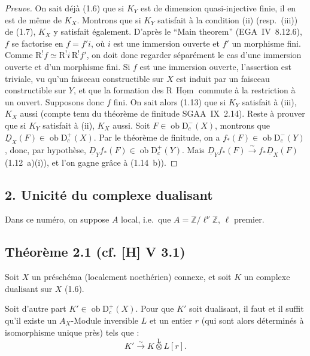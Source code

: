\documentclass[11pt]{article}
\DeclareMathOperator{\Hom}{Hom}
\newcommand{\R}{\mathrm{R}}
\newcommand{\D}{\mathrm{D}}
\newcommand{\Z}{\mathbb{Z}}
\newcommand{\ob}{\operatorname{ob}}
\providecommand{\Hom}{\operatorname{Hom}}
\providecommand{\ob}{\operatorname{ob}}
\begin{document}
\begin{proof}[Preuve]
On sait déjà (1.6) que si $K_Y$ est de dimension quasi-injective finie, il en est de même de $K_X$. Montrons que si $K_Y$ satisfait à la condition (ii) (resp.~(iii)) de (1.7), $K_X$ y satisfait également. D'après le ``Main theorem'' (EGA~IV~8.12.6), $f$ se factorise en $f = f'i$, où $i$ est une immersion ouverte et $f'$ un morphisme fini. Comme $\R^{!}f \simeq \R^{!}i \, \R^{!}f'$, on doit donc regarder séparément le cas d'une immersion ouverte et d'un morphisme fini. Si $f$ est une immersion ouverte, l'assertion est triviale, vu qu'un faisceau constructible sur $X$ est induit par un faisceau constructible sur $Y$, et que la formation des $\R\,\underline{\Hom}$ commute à la restriction à un ouvert. Supposons donc $f$ fini. On sait alors (1.13) que si $K_Y$ satisfait à (iii), $K_X$ aussi (compte tenu du théorème de finitude SGAA~IX~2.14). Reste à prouver que si $K_Y$ satisfait à (ii), $K_X$ aussi. Soit $F \in \ob \D_c^{-}(X)$, montrons que $\underline{D}_X(F) \in \ob \D_c^{+}(X)$. Par le théorème de finitude, on a $f_{*}(F) \in \ob \D_c^{-}(Y)$, donc, par hypothèse, $\underline{D}_Y f_{*}(F) \in \ob \D_c^{+}(Y)$. Mais $\underline{D}_Y f_{*}(F) \xrightarrow{\sim} f_{*}\underline{D}_X(F)$ (1.12~a)(i)), et l'on gagne grâce à (1.14~b)).
\end{proof}

\subsection{2. Unicité du complexe dualisant}

Dans ce numéro, on suppose $A$ local, i.e.~que $A = \Z/\ell^{\nu}\Z$, $\ell$ premier.

\subsection*{Théorème 2.1 (cf. [H] V 3.1)}
Soit $X$ un préschéma (localement noethérien) connexe, et soit $K$ un complexe dualisant sur $X$ (1.6).

Soit d'autre part $K' \in \ob \D_c^{+}(X)$. Pour que $K'$ soit dualisant, il faut et il suffit qu'il existe un $A_X$-Module inversible $L$ et un entier $r$ (qui sont alors déterminés à isomorphisme unique près) tels que :
\[
K' \xrightarrow{\sim} K \mathop{\otimes}\limits^{\mathrm{L}} L[r].
\]
\end{document}
